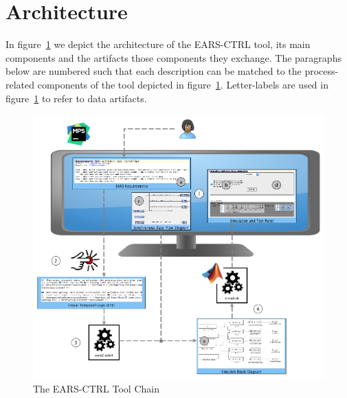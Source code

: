 \section{Architecture}
In figure~\ref{fig:ears_ctrl_toolchain} we depict the architecture
of the \textsf{EARS-CTRL} tool, its main components and the artifacts those
components they exchange. The paragraphs below are numbered such that each
description can be matched to the process-related components of the tool depicted in
figure~\ref{fig:ears_ctrl_toolchain}.
Letter-labels are used in figure~\ref{fig:ears_ctrl_toolchain} to refer to data
artifacts.\\
\begin{figure}[h!] 
   \begin{center}
     \includegraphics[width=1\textwidth]{images/toolchain.png}
     \caption{The \textsf{EARS-CTRL} Tool Chain}
     \label{fig:ears_ctrl_toolchain}
   \end{center}
 \end{figure}

